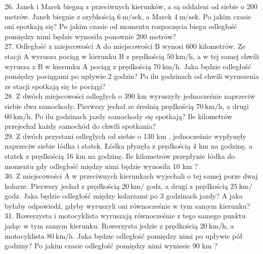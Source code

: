 \documentclass[10pt]{article}
\begin{document}
26. Janek i Marek biegną z przeciwnych kierunków, a są oddaleni od siebie o 200 metrów. Janek biegnie z szybkością \(6 \mathrm{~m} / \mathrm{sek}\), a Marek \(4 \mathrm{~m} / \mathrm{sek}\). Po jakim czasie oni spotkają się? Po jakim czasie od momentu rozpoczęcia biegu odległość pomiędzy nimi będzie wynosiła ponownie 200 metrów?\\
27. Odległość z miejscowości A do miejscowości B wynosi 600 kilometrów. Ze stacji A wyrusza pociąg w kierunku B z prędkością \(50 \mathrm{~km} / \mathrm{h}\), a w tej samej chwili wyrusza z B w kierunku A pociąg z prędkością \(70 \mathrm{~km} / \mathrm{h}\). Jaka będzie odległość pomiędzy pociągami po upływie 2 godzin? Po ilu godzinach od chwili wyruszenia ze stacji spotkają się te pociągi?\\
28. Z dwóch miejscowości odległych o 390 km wyruszyły jednocześnie naprzeciw siebie dwa samochody. Pierwszy jechał ze średnią prędkością \(70 \mathrm{~km} / \mathrm{h}\), a drugi \(60 \mathrm{~km} / \mathrm{h}\). Po ilu godzinach jazdy samochody się spotkają? Ile kilometrów przejechał każdy samochód do chwili spotkania?\\
29. Z dwóch przystani odległych od siebie o 130 km , jednocześnie wypłynęły naprzeciw siebie łódka i statek. Łódka płynęła z prędkością 4 km na godzinę, a statek z prędkością 16 km na godzinę. Ile kilometrów przepłynie łódka do momentu gdy odległość między nimi będzie wynosiła 10 km ?\\
30. Z miejscowości A w przeciwnych kierunkach wyjechali o tej samej porze dwaj kolarze. Pierwszy jechał z prędkością \(20 \mathrm{~km} /\) godz, a drugi z prędkością \(25 \mathrm{~km} /\) godz. Jaka będzie odległość między kolarzami po 3 godzinach jazdy? A jaka byłaby odpowiedź, gdyby wyruszyli oni równocześnie w tym samym kierunku?\\
31. Rowerzysta i motocyklista wyruszają równocześnie z tego samego punktu jadąc w tym samym kierunku. Rowerzysta jedzie z prędkością \(20 \mathrm{~km} / \mathrm{h}\), a motocyklista \(80 \mathrm{~km} / \mathrm{h}\). Jaka będzie odległość pomiędzy nimi po upływie pół godziny? Po jakim czasie odległość pomiędzy nimi wyniesie 90 km ?
\end{document}
